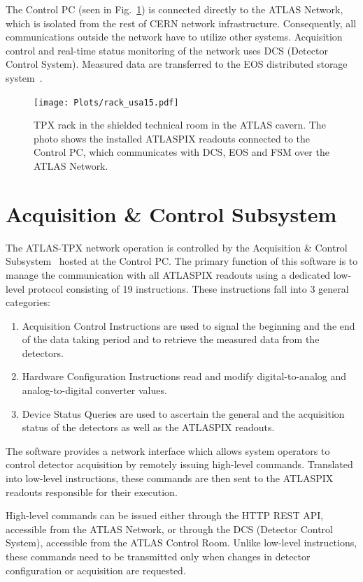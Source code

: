 \documentclass[conference]{IEEEtran}
\begin{document}
The Control PC (seen in Fig.~\ref{fig:rack}) is connected directly to the ATLAS Network, which is isolated from the rest of CERN network infrastructure. Consequently, all communications outside the network have to utilize other systems. Acquisition control and real-time status monitoring of the network uses DCS (Detector Control System). Measured data are transferred to the EOS distributed storage system~\cite{MAscetti2015,Peters2011}.

\begin{figure}[tbp]
	\centering
        \texttt{[image: Plots/rack\_usa15.pdf]}
      \caption {TPX rack in the shielded technical room in the ATLAS cavern. The photo shows the installed ATLASPIX readouts connected to the Control PC, which communicates with DCS, EOS and FSM over the ATLAS Network.}
    \label{fig:rack}
\end{figure}

\section{\label{sec:acquisition}Acquisition \& Control Subsystem}
The ATLAS-TPX network operation is controlled by the Acquisition \& Control Subsystem~\cite{Begera2016} hosted at the Control PC. The primary function of this software is to manage the communication with all ATLASPIX readouts using a dedicated low-level protocol consisting of 19 instructions. These instructions fall into 3 general categories:
~
\begin{enumerate}
  \item Acquisition Control Instructions are used to signal the beginning and the end of the data taking period and to retrieve the measured data from the detectors.
  \item Hardware Configuration Instructions read and modify digital-to-analog and analog-to-digital converter values.
  \item Device Status Queries are used to ascertain the general and the acquisition status of the detectors as well as the ATLASPIX readouts.
\end{enumerate}

The software provides a network interface which allows system operators to control detector acquisition by remotely issuing high-level commands. Translated into low-level instructions, these commands are then sent to the ATLASPIX readouts responsible for their execution.

High-level commands can be issued either through the HTTP REST API, accessible from the ATLAS Network, or through the DCS (Detector Control System), accessible from the ATLAS Control Room. Unlike low-level instructions, these commands need to be transmitted only when changes in detector configuration or acquisition are requested.
\end{document}

